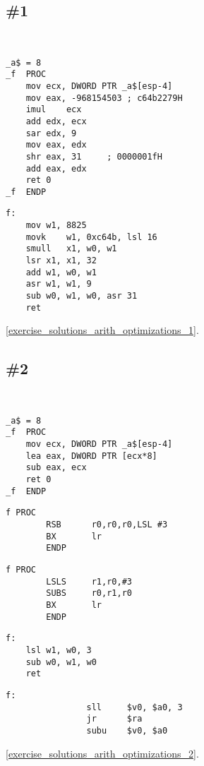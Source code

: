 \section{\Exercises}

\subsection{\Exercise \#1}
\label{exercise_arith_optimizations_1}

\WhatThisCodeDoes\

\begin{lstlisting}[caption=\Optimizing MSVC 2010]
_a$ = 8
_f	PROC
	mov	ecx, DWORD PTR _a$[esp-4]
	mov	eax, -968154503	; c64b2279H
	imul	ecx
	add	edx, ecx
	sar	edx, 9
	mov	eax, edx
	shr	eax, 31		; 0000001fH
	add	eax, edx
	ret	0
_f	ENDP
\end{lstlisting}

\begin{lstlisting}[caption=\Optimizing GCC 4.9 (ARM64)]
f:
	mov	w1, 8825
	movk	w1, 0xc64b, lsl 16
	smull	x1, w0, w1
	lsr	x1, x1, 32
	add	w1, w0, w1
	asr	w1, w1, 9
	sub	w0, w1, w0, asr 31
	ret
\end{lstlisting}

\Answer\: \ref{exercise_solutions_arith_optimizations_1}.

\subsection{\Exercise \#2}
\label{exercise_arith_optimizations_2}

\WhatThisCodeDoes\

\begin{lstlisting}[caption=\Optimizing MSVC 2010]
_a$ = 8
_f	PROC
	mov	ecx, DWORD PTR _a$[esp-4]
	lea	eax, DWORD PTR [ecx*8]
	sub	eax, ecx
	ret	0
_f	ENDP
\end{lstlisting}

\begin{lstlisting}[caption=\NonOptimizingKeilVI (\ARMMode)]
f PROC
        RSB      r0,r0,r0,LSL #3
        BX       lr
        ENDP
\end{lstlisting}

\begin{lstlisting}[caption=\NonOptimizingKeilVI (\ThumbMode)]
f PROC
        LSLS     r1,r0,#3
        SUBS     r0,r1,r0
        BX       lr
        ENDP
\end{lstlisting}

\begin{lstlisting}[caption=\Optimizing GCC 4.9 (ARM64)]
f:
	lsl	w1, w0, 3
	sub	w0, w1, w0
	ret
\end{lstlisting}

\begin{lstlisting}[caption=\Optimizing GCC 4.4.5 (MIPS) (IDA)]
f:
                sll     $v0, $a0, 3
                jr      $ra
                subu    $v0, $a0
\end{lstlisting}

\Answer\: \ref{exercise_solutions_arith_optimizations_2}.
